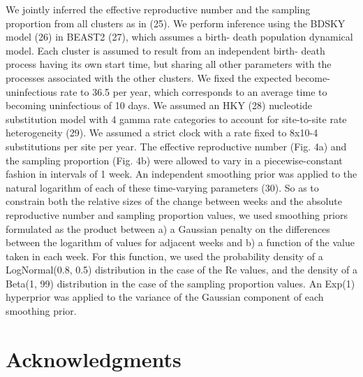 \documentclass[9pt,twocolumn,twoside,lineno]{pnas-new}
\begin{document}
We jointly inferred the effective reproductive number and the sampling proportion from all clusters as in (25). We perform inference using the BDSKY model (26) in BEAST2 (27), which assumes a birth- death population dynamical model. Each cluster is assumed to result from an independent birth- death process having its own start time, but sharing all other parameters with the processes associated with the other clusters. We fixed the expected become-uninfectious rate to 36.5 per year, which corresponds to an average time to becoming uninfectious of 10 days. We assumed an HKY (28) nucleotide substitution model with 4 gamma rate categories to account for site-to-site rate heterogeneity (29). We assumed a strict clock with a rate fixed to 8x10-4 substitutions per site per year. The effective reproductive number (Fig. 4a) and the sampling proportion (Fig. 4b) were allowed to vary in a piecewise-constant fashion in intervals of 1 week. An independent smoothing prior was applied to the natural logarithm of each of these time-varying parameters (30). So as to constrain both the relative sizes of the change between weeks and the absolute reproductive number and sampling proportion values, we used smoothing priors formulated as the product between a) a Gaussian penalty on the differences between the logarithm of values for adjacent weeks and b) a function of the value taken in each week. For this function, we used the probability density of a LogNormal(0.8, 0.5) distribution in the case of the Re values, and the density of a Beta(1, 99) distribution in the case of the sampling proportion values. An Exp(1) hyperprior was applied to the variance of the Gaussian component of each smoothing prior.

\section{Acknowledgments}





\end{document}
